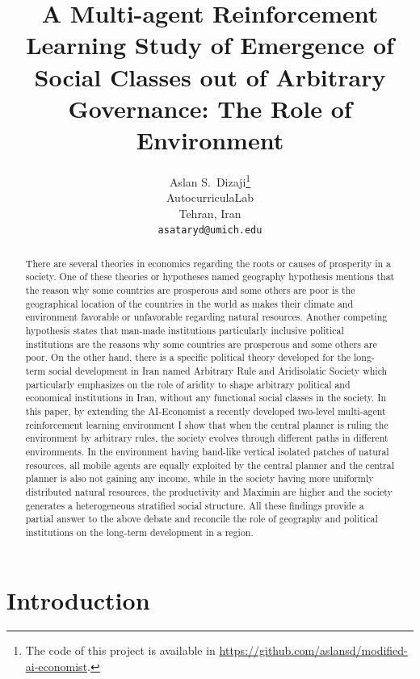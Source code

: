 \documentclass{article}
\title{A Multi-agent Reinforcement Learning Study of Emergence of Social Classes out of Arbitrary Governance: The Role of Environment}
\author{%
  Aslan S.~Dizaji\thanks{The code of this project is available in \url{https://github.com/aslansd/modified-ai-economist}.} \\
  AutocurriculaLab\\
  Tehran, Iran\\
  \texttt{asataryd@umich.edu} \\
}
\begin{document}
\maketitle

\begin{abstract}
  There are several theories in economics regarding the roots or causes of prosperity in a society. One of these theories or hypotheses \textendash named geography hypothesis \textendash mentions that the reason why some countries are prosperous and some others are poor is the geographical location of the countries in the world as makes their climate and environment favorable or unfavorable regarding natural resources. Another competing hypothesis states that man-made institutions particularly inclusive political institutions are the reasons why some countries are prosperous and some others are poor. On the other hand, there is a specific political theory developed for the long-term social development in Iran \textendash named Arbitrary Rule and Aridisolatic Society which particularly emphasizes on the role of aridity to shape arbitrary political and economical institutions in Iran, without any functional social classes in the society. In this paper, by extending the AI-Economist \textendash a recently developed two-level multi-agent reinforcement learning environment \textendash I show that when the central planner is ruling the environment by arbitrary rules, the society evolves through different paths in different environments. In the environment having band-like vertical isolated patches of natural resources, all mobile agents are equally exploited by the central planner and the central planner is also not gaining any income, while in the society having more uniformly distributed natural resources, the productivity and Maximin are higher and the society generates a heterogeneous stratified social structure. All these findings provide a partial answer to the above debate and reconcile the role of geography and political institutions on the long-term development in a region.
\end{abstract}

\section{Introduction}
\end{document}

